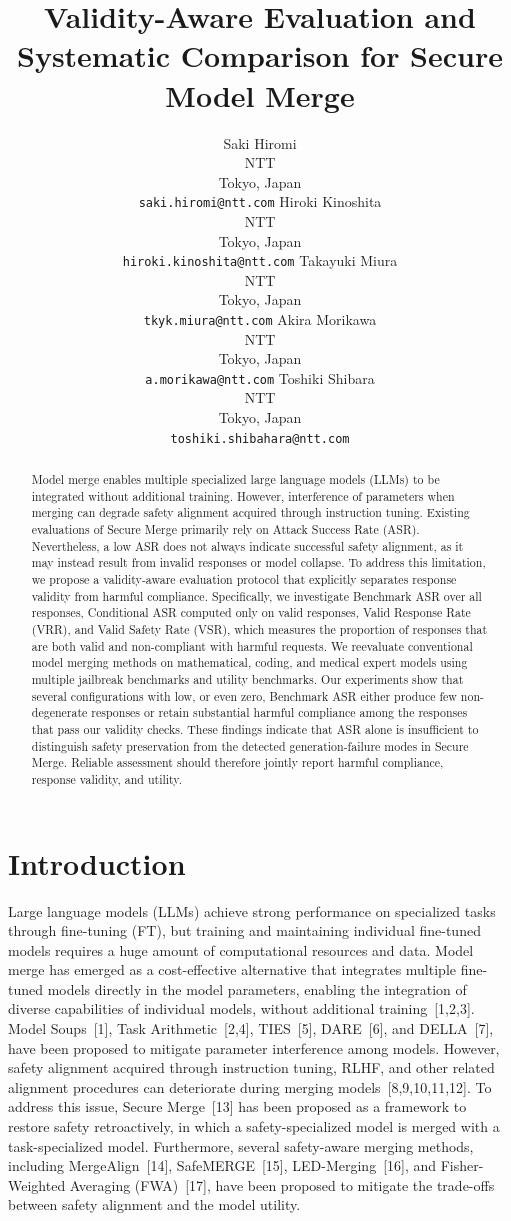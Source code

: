 \documentclass{article}
\title{Validity-Aware Evaluation and Systematic Comparison for Secure Model Merge}
\author{%
  Saki Hiromi \\
  NTT \\
  Tokyo, Japan \\
  \texttt{saki.hiromi@ntt.com}
  \And
  Hiroki Kinoshita \\
  NTT \\
  Tokyo, Japan \\
  \texttt{hiroki.kinoshita@ntt.com}
  \And
  Takayuki Miura \\
  NTT \\
  Tokyo, Japan \\
  \texttt{tkyk.miura@ntt.com}
  \And
  Akira Morikawa \\
  NTT \\
  Tokyo, Japan \\
  \texttt{a.morikawa@ntt.com}
  \And
  Toshiki Shibara \\
  NTT \\
  Tokyo, Japan \\
  \texttt{toshiki.shibahara@ntt.com}
}
\begin{document}
\maketitle


\begin{abstract}
    Model merge enables multiple specialized large language models (LLMs) to be integrated without additional training. However, interference of parameters when merging can degrade safety alignment acquired through instruction tuning. Existing evaluations of Secure Merge primarily rely on Attack Success Rate (ASR). Nevertheless, a low ASR does not always indicate successful safety alignment, as it may instead result from invalid responses or model collapse. To address this limitation, we propose a validity-aware evaluation protocol that explicitly separates response validity from harmful compliance. Specifically, we investigate Benchmark ASR over all responses, Conditional ASR computed only on valid responses, Valid Response Rate (VRR), and Valid Safety Rate (VSR), which measures the proportion of responses that are both valid and non-compliant with harmful requests. We reevaluate conventional model merging methods on mathematical, coding, and medical expert models using multiple jailbreak benchmarks and utility benchmarks. Our experiments show that several configurations with low, or even zero, Benchmark ASR either produce few non-degenerate responses or retain substantial harmful compliance among the responses that pass our validity checks. These findings indicate that ASR alone is insufficient to distinguish safety preservation from the detected generation-failure modes in Secure Merge. Reliable assessment should therefore jointly report harmful compliance, response validity, and utility.
\end{abstract}


\section{Introduction}
Large language models (LLMs) achieve strong performance on specialized tasks through fine-tuning (FT), but training and maintaining individual fine-tuned models requires a huge amount of computational resources and data. Model merge has emerged as a cost-effective alternative that integrates multiple fine-tuned models directly in the model parameters, enabling the integration of diverse capabilities of individual models, without additional training~[1,2,3]. Model Soups~[1], Task Arithmetic~[2,4], TIES~[5], DARE~[6], and DELLA~[7], have been proposed to mitigate parameter interference among models. However, safety alignment acquired through instruction tuning, RLHF, and other related alignment procedures can deteriorate during merging models~[8,9,10,11,12]. To address this issue, Secure Merge~[13] has been proposed as a framework to restore safety retroactively, in which a safety-specialized model is merged with a task-specialized model. Furthermore, several safety-aware merging methods, including MergeAlign~[14], SafeMERGE~[15], LED-Merging~[16], and Fisher-Weighted Averaging (FWA)~[17], have been proposed to mitigate the trade-offs between safety alignment and the model utility.
\end{document}
